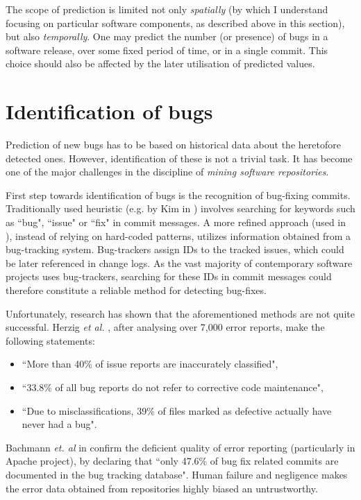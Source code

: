 \documentclass{pracamgr}
\begin{document}
The scope of prediction is limited not only \emph{spatially} (by which I understand focusing on particular software components, as described above in this section), but also \emph{temporally}. One may predict the number (or presence) of bugs in a software release, over some fixed period of time, or in a single commit. This choice should also be affected by the later utilisation of predicted values.

\section{Identification of bugs}
\label{sec:identification}
Prediction of new bugs has to be based on historical data about the heretofore detected ones. However, identification of these is not a trivial task. It has become one of the major challenges in the discipline of \emph{mining software repositories}.

First step towards identification of bugs is the recognition of bug-fixing commits. Traditionally used heuristic (e.g. by Kim in \cite{adaptive}) involves searching for keywords such as ``bug", ``issue" or ``fix" in commit messages. A more refined approach (used in \cite{Ekanayake, method-level, adaptive}), instead of relying on hard-coded patterns, utilizes information obtained from a bug-tracking system. Bug-trackers assign IDs to the tracked issues, which could be later referenced in change logs. As the vast majority of contemporary software projects uses bug-trackers, searching for these IDs in commit messages could therefore constitute a reliable method for detecting bug-fixes.

Unfortunately, research has shown that the aforementioned methods are not quite successful. Herzig \textit{et al.} \cite{Herzig}, after analysing over 7,000 error reports, make the following statements:
\begin{itemize}
	\item ``More than 40\% of issue reports are inaccurately classified",
	\item ``33.8\% of all bug reports do not refer to corrective code maintenance",
	\item ``Due to misclassifications, 39\% of files marked as defective actually have never had a bug".
\end{itemize}
Bachmann \textit{et. al} in \cite{Bachmann} confirm the deficient quality of error reporting (particularly in Apache project), by declaring that ``only 47.6\% of bug fix related commits are documented in the bug tracking database". Human failure and negligence makes the error data obtained from repositories highly biased an untrustworthy.
\end{document}
